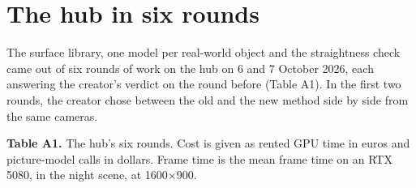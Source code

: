 \section{The hub in six rounds}\label{the-hub-in-six-rounds}

The surface library, one model per real-world object and the straightness check came out of six rounds of work on the hub on 6 and 7 October 2026, each answering the creator's verdict on the round before (Table A1). In the first two rounds, the creator chose between the old and the new method side by side from the same cameras.

\par{}\ifdim\dimexpr\pagegoal-\pagetotal\relax<12\baselineskip\clearpage\fi

\textbf{Table A1.} The hub's six rounds. Cost is given as rented GPU time in euros and picture-model calls in dollars. Frame time is the mean frame time on an RTX 5080, in the night scene, at 1600×900.

\begingroup\footnotesize\setlength{\tabcolsep}{3pt}

